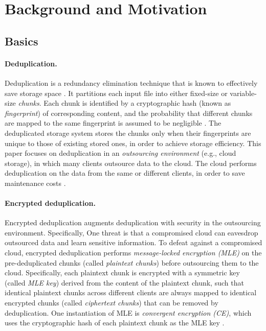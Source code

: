 \section{Background and Motivation}
\label{sec:background}

\subsection{Basics}
\label{sub:basics}


\paragraph{Deduplication.}
Deduplication is a redundancy elimination technique that is known to effectively save storage space \cite{wallace12, meyer11}. It partitions each input file into either fixed-size or variable-size {\em chunks}. Each chunk is identified by a cryptographic hash (known as {\em fingerprint}) of corresponding content, and the probability that different chunks are mapped to the same fingerprint is assumed to be negligible \cite{black06}. The deduplicated storage system stores the chunks only when their fingerprints are unique to those of existing stored ones, in order to achieve storage efficiency. This paper focuses on deduplication in an {\em outsourcing environment} (e.g., cloud storage), in which many clients outsource data to the cloud. The cloud performs deduplication on the data from the same or different clients, in order to save maintenance costs \cite{harnik10}.


\paragraph{Encrypted deduplication.}
Encrypted deduplication augments deduplication with security in the outsourcing environment. Specifically, One  threat is that a compromised cloud can eavesdrop outsourced data and learn sensitive information.
To defeat against a compromised cloud, encrypted deduplication performs {\em message-locked encryption (MLE)} \cite{bellare13a, bellare13b} on the pre-deduplicated chunks (called {\em plaintext chunks}) before outsourcing them to the cloud. Specifically, each plaintext chunk is  encrypted with a symmetric key (called {\em MLE key}) derived from the content of the plaintext chunk, such that identical plaintext chunks across different clients are always mapped to identical encrypted chunks (called {\em ciphertext chunks}) that can be removed by deduplication. One instantiation of MLE is {\em convergent encryption (CE)}, which uses the cryptographic hash of each plaintext chunk as the MLE key \cite{douceur02}.

